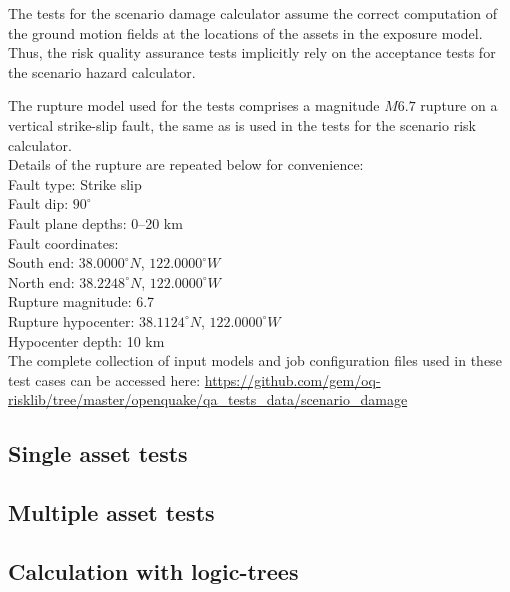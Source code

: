 The tests for the scenario damage calculator assume the correct computation of the ground motion fields at the locations of the assets in the exposure model. Thus, the risk quality assurance tests implicitly rely on the acceptance tests for the scenario hazard calculator.

The rupture model used for the tests comprises a magnitude $M6.7$ rupture on a vertical strike-slip fault, the same as is used in the tests for the scenario risk calculator.\\

\noindent Details of the rupture are repeated below for convenience:\\

\noindent
Fault type: Strike slip\\
Fault dip: $90^{\circ}$\\
Fault plane depths: 0--20 km\\
Fault coordinates:\\
South end: $38.0000^{\circ} N$, $122.0000^{\circ} W$\\
North end: $38.2248^{\circ} N$, $122.0000^{\circ} W$\\
Rupture magnitude: 6.7\\
Rupture hypocenter: $38.1124^{\circ} N$, $122.0000^{\circ} W$\\
Hypocenter depth: 10 km\\

The complete collection of input models and job configuration files used in these test cases can be accessed here:
\href{https://github.com/gem/oq-risklib/tree/master/openquake/qa_tests_data/scenario_damage}
{https://github.com/gem/oq-risklib/tree/master/openquake/qa\_tests\_data/scenario\_damage}

\subsection{Single asset tests}
\label{subsec:acc-sd-single}


\subsection{Multiple asset tests}
\label{subsec:acc-sd-multiple}


\subsection{Calculation with logic-trees}
\label{subsec:acc-sd-lt}

